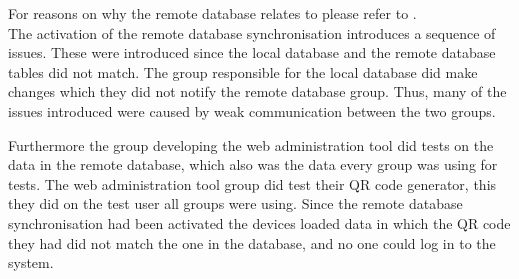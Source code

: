 For reasons on why the remote database relates to \launcher please refer to .\\

The activation of the remote database synchronisation introduces a sequence of issues. These were introduced since the local database and the remote database tables did not match. The group responsible for the local database did make changes which they did not notify the remote database group. Thus, many of the issues introduced were caused by weak communication between the two groups.

Furthermore the group developing the web administration tool did tests on the data in the remote database, which also was the data every group was using for tests.
The web administration tool group did test their QR code generator, this they did on the test user all groups were using.
Since the remote database synchronisation had been activated the devices loaded data in which the QR code they had did not match the one in the database, and no one could log in to the system.